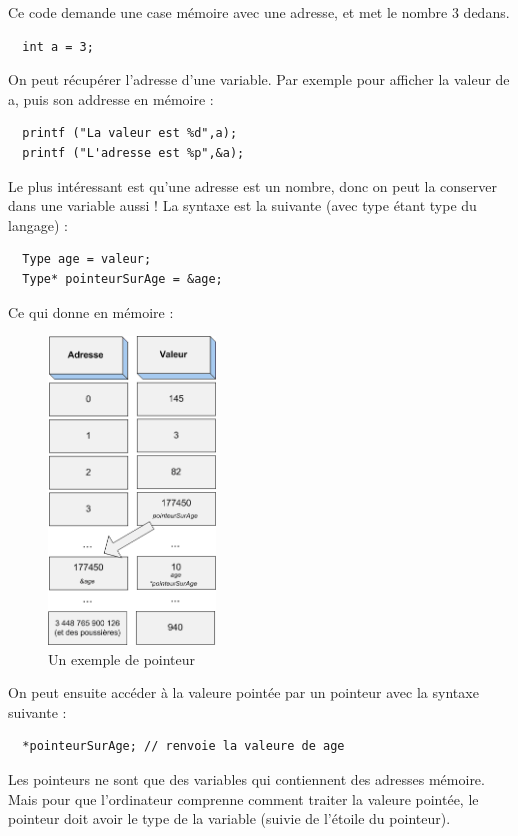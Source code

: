 Ce code demande une case mémoire avec une adresse, et met le nombre 3 dedans.

\begin{lstlisting}
  int a = 3;
\end{lstlisting}

On peut récupérer l'adresse d'une variable. Par exemple pour afficher la valeur de a, puis son addresse en mémoire : 

\begin{lstlisting}
  printf ("La valeur est %d",a);
  printf ("L'adresse est %p",&a);
\end{lstlisting}

Le plus intéressant est qu'une adresse est un nombre, donc on peut la conserver dans une variable aussi !
La syntaxe est la suivante (avec type étant type du langage) : 

\begin{lstlisting}
  Type age = valeur;
  Type* pointeurSurAge = &age;
\end{lstlisting}

Ce qui donne en mémoire : 

\begin{figure}[H]
	\begin{center}
	  \includegraphics[width=12em]{Annexes/Images/pointeurs.png}
	\end{center}
	\caption{Un exemple de pointeur}
\end{figure}

On peut ensuite accéder à la valeure pointée par un pointeur avec la syntaxe suivante : 
\begin{lstlisting}
  *pointeurSurAge; // renvoie la valeure de age
\end{lstlisting}

Les pointeurs ne sont que des variables qui contiennent des adresses mémoire. Mais pour que l'ordinateur comprenne comment traiter la valeure pointée, le pointeur doit 
avoir le type de la variable (suivie de l'étoile du pointeur).

